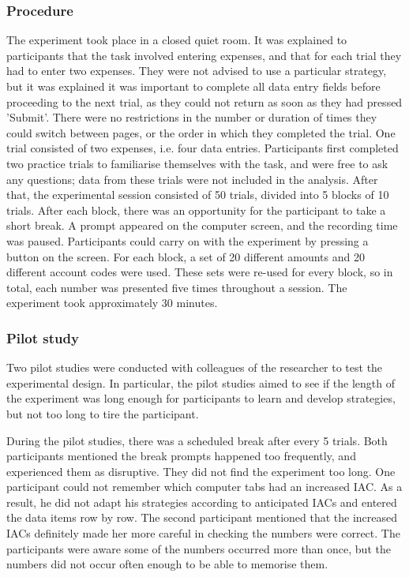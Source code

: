\subsubsection{Procedure}
The experiment took place in a closed quiet room. It was explained to participants that the task involved entering expenses, and that for each trial they had to enter two expenses. They were not advised to use a particular strategy, but it was explained it was important to complete all data entry fields before proceeding to the next trial, as they could not return as soon as they had pressed 'Submit'. There were no restrictions in the number or duration of times they could switch between pages, or the order in which they completed the trial. One trial consisted of two expenses, i.e. four data entries. Participants first completed two practice trials to familiarise themselves with the task, and were free to ask any questions; data from these trials were not included in the analysis. After that, the experimental session consisted of 50 trials, divided into 5 blocks of 10 trials. After each block, there was an opportunity for the participant to take a short break. A prompt appeared on the computer screen, and the recording time was paused. Participants could carry on with the experiment by pressing a button on the screen. For each block, a set of 20 different amounts and 20 different account codes were used. These sets were re-used for every block, so in total, each number was presented five times throughout a session. The experiment took approximately 30 minutes.

\subsubsection{Pilot study}
Two pilot studies were conducted with colleagues of the researcher to test the experimental design. In particular, the pilot studies aimed to see if the length of the experiment was long enough for participants to learn and develop  strategies, but not too long to tire the participant.

During the pilot studies, there was a scheduled break after every 5 trials. Both participants mentioned the break prompts happened too frequently, and experienced them as disruptive. They did not find the experiment too long. One participant could not remember which computer tabs had an increased IAC. As a result, he did not adapt his strategies according to anticipated IACs and entered the data items row by row. The second participant mentioned that the increased IACs definitely made her more careful in checking the numbers were correct. The participants were aware some of the numbers occurred more than once, but the numbers did not occur often enough to be able to memorise them. 

